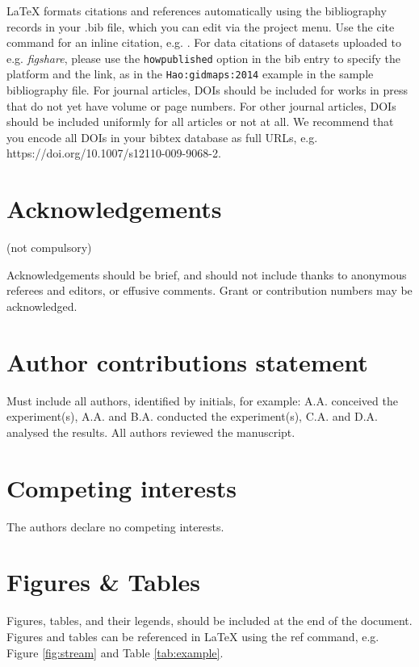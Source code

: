 \documentclass[fleqn,10pt]{wlscirep}
\begin{document}


\noindent LaTeX formats citations and references automatically using the bibliography
records in your .bib file, which you can edit via the project menu. Use the cite command
for an inline citation, e.g. \cite{Kaufman2020, Figueredo:2009dg, Babichev2002,
behringer2014manipulating}. For data citations of datasets uploaded to e.g.
\emph{figshare}, please use the \verb|howpublished| option in the bib entry to specify
the platform and the link, as in the \verb|Hao:gidmaps:2014| example in the sample
bibliography file. For journal articles, DOIs should be included for works in press that
do not yet have volume or page numbers. For other journal articles, DOIs should be
included uniformly for all articles or not at all. We recommend that you encode all DOIs
in your bibtex database as full URLs, e.g. https://doi.org/10.1007/s12110-009-9068-2.

\section*{Acknowledgements} (not compulsory)

Acknowledgements should be brief, and should not include thanks to anonymous referees
and editors, or effusive comments. Grant or contribution numbers may be acknowledged.

\section*{Author contributions statement}

Must include all authors, identified by initials, for example: A.A. conceived the
experiment(s), A.A. and B.A. conducted the experiment(s), C.A. and D.A. analysed the
results. All authors reviewed the manuscript.

\section*{Competing interests}

The authors declare no competing interests.

\section*{Figures \& Tables}

Figures, tables, and their legends, should be included at the end of the document.
Figures and tables can be referenced in \LaTeX{} using the ref command, e.g. Figure
\ref{fig:stream} and Table \ref{tab:example}.
\end{document}
